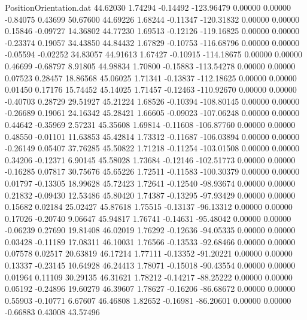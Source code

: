 \begin{filecontents}{PositionOrientation.dat}
  44.62030    1.74294   -0.14492  -123.96479    0.00000    0.00000   -0.84075    0.43699   50.67600
  44.69226    1.68244   -0.11347  -120.31832    0.00000    0.00000    0.15846   -0.09727   14.36802
  44.77230    1.69513   -0.12126  -119.16825    0.00000    0.00000   -0.23374    0.19057   34.43850
  44.84432    1.67829   -0.10753  -116.68796    0.00000    0.00000   -0.05594   -0.02252   34.83057
  44.91613    1.67427   -0.10915  -114.18675    0.00000    0.00000    0.46699   -0.68797    8.91805
  44.98834    1.70800   -0.15883  -113.54278    0.00000    0.00000    0.07523    0.28457   18.86568
  45.06025    1.71341   -0.13837  -112.18625    0.00000    0.00000    0.01450    0.17176   15.74452
  45.14025    1.71457   -0.12463  -110.92670    0.00000    0.00000   -0.40703    0.28729   29.51927
  45.21224    1.68526   -0.10394  -108.80145    0.00000    0.00000   -0.26689    0.19061   24.16342
  45.28421    1.66605   -0.09023  -107.06248    0.00000    0.00000    0.44642   -0.35969    2.57231
  45.35608    1.69814   -0.11608  -106.87760    0.00000    0.00000    0.48550   -0.01101   11.63853
  45.42814    1.73312   -0.11687  -106.03894    0.00000    0.00000   -0.26149    0.05407   37.76285
  45.50822    1.71218   -0.11254  -103.01508    0.00000    0.00000    0.34206   -0.12371    6.90145
  45.58028    1.73684   -0.12146  -102.51773    0.00000    0.00000   -0.16285    0.07817   30.75676
  45.65226    1.72511   -0.11583  -100.30379    0.00000    0.00000    0.01797   -0.13305   18.99628
  45.72423    1.72641   -0.12540   -98.93674    0.00000    0.00000    0.21832   -0.09430   12.53486
  45.80420    1.74387   -0.13295   -97.93429    0.00000    0.00000    0.15682    0.02184   25.02427
  45.87618    1.75515   -0.13137   -96.13312    0.00000    0.00000    0.17026   -0.20740    9.06647
  45.94817    1.76741   -0.14631   -95.48042    0.00000    0.00000   -0.06239    0.27690   19.81408
  46.02019    1.76292   -0.12636   -94.05335    0.00000    0.00000    0.03428   -0.11189   17.08311
  46.10031    1.76566   -0.13533   -92.68466    0.00000    0.00000    0.07578    0.02517   20.63819
  46.17214    1.77111   -0.13352   -91.20221    0.00000    0.00000    0.13337   -0.23145   10.64928
  46.24413    1.78071   -0.15018   -90.43554    0.00000    0.00000    0.01964    0.11109   30.29135
  46.31621    1.78212   -0.14217   -88.25222    0.00000    0.00000    0.05192   -0.24896   19.60279
  46.39607    1.78627   -0.16206   -86.68672    0.00000    0.00000    0.55903   -0.10771    6.67607
  46.46808    1.82652   -0.16981   -86.20601    0.00000    0.00000   -0.66883    0.43008   43.57496

\end{filecontents}
